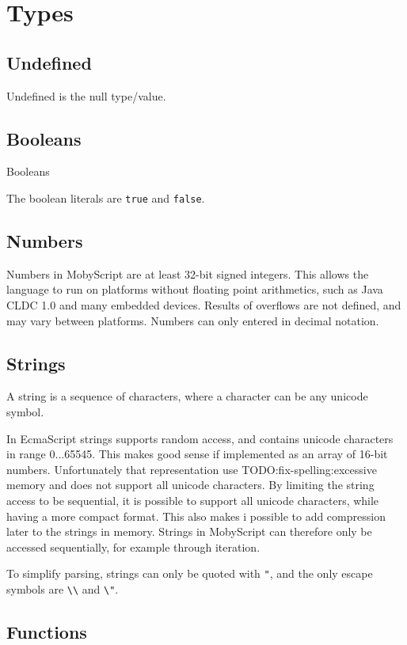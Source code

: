 \section{Types}

\subsection{Undefined}
Undefined is the null type/value.

\subsection{Booleans}
Booleans 

The boolean literals are \verb|true| and \verb|false|.


\subsection{Numbers}

Numbers in MobyScript are at least 32-bit signed integers. 
This allows the language to run on platforms without floating point arithmetics, such as Java CLDC 1.0 and many embedded devices.
Results of overflows are not defined, and may vary between platforms.
Numbers can only entered in decimal notation.

\subsection{Strings}

A string is a sequence of characters, where a character can be any unicode symbol. 


In EcmaScript strings supports random access, and contains unicode characters in range 0...65545.
This makes good sense if implemented as an array of 16-bit numbers. Unfortunately that representation use TODO:fix-spelling:excessive memory and does not support all unicode characters. 
By limiting the string access to be sequential, it is possible to support all unicode characters, while having a more compact format. 
This also makes i possible to add compression later to the strings in memory.
Strings in MobyScript can therefore only be accessed sequentially, for example through iteration.

To simplify parsing, strings can only be quoted with \verb|"|, and the only escape symbols are \verb|\\| and \verb|\"|.

\subsection{Functions}

